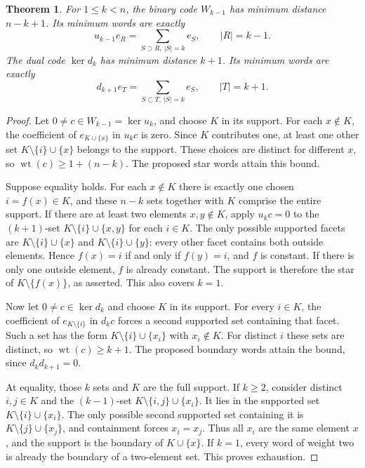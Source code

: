 \documentclass[11pt,a4paper]{article}
\newtheorem{theorem}{Theorem}[section]
\numberwithin{equation}{section}
\newcommand{\wt}{\operatorname{wt}}
\begin{document}
\begin{theorem}\label{ULCD.SimplexMin}
For $1\leq k<n$, the binary code $W_{k-1}$ has minimum distance $n-k+1$.
Its minimum words are exactly
\[
 u_{k-1}e_R=\sum_{S\supset R,\ |S|=k}e_S,
 \qquad |R|=k-1.
\]
The dual code $\ker d_k$ has minimum distance $k+1$. Its minimum words
are exactly
\[
 d_{k+1}e_T=\sum_{S\subset T,\ |S|=k}e_S,
 \qquad |T|=k+1.
\]
\end{theorem}
\begin{proof}
Let $0\ne c\in W_{k-1}=\ker u_k$, and choose $K$ in its support. For
each $x\notin K$, the coefficient of $e_{K\cup\{x\}}$ in $u_kc$ is zero.
Since $K$ contributes one, at least one other set $K\setminus\{i\}\cup\{x\}$
belongs to the support. These choices are distinct for different $x$, so
$\wt(c)\geq1+(n-k)$. The proposed star words attain this bound.

Suppose equality holds. For each $x\notin K$ there is exactly one chosen
$i=f(x)\in K$, and these $n-k$ sets together with $K$ comprise the entire
support. If there are at least two elements $x,y\notin K$, apply $u_kc=0$
to the $(k+1)$-set $K\setminus\{i\}\cup\{x,y\}$ for each $i\in K$.
The only possible supported facets are
$K\setminus\{i\}\cup\{x\}$ and $K\setminus\{i\}\cup\{y\}$: every other
facet contains both outside elements. Hence $f(x)=i$ if and only if
$f(y)=i$, and $f$ is constant. If there is only one outside element,
$f$ is already constant. The support is therefore the star of
$K\setminus\{f(x)\}$, as asserted. This also covers $k=1$.

Now let $0\ne c\in\ker d_k$ and choose $K$ in its support. For every
$i\in K$, the coefficient of $e_{K\setminus\{i\}}$ in $d_kc$ forces a
second supported set containing that facet. Such a set has the form
$K\setminus\{i\}\cup\{x_i\}$ with $x_i\notin K$. For distinct $i$ these
sets are distinct, so $\wt(c)\geq k+1$. The proposed boundary words attain
the bound, since $d_kd_{k+1}=0$.

At equality, those $k$ sets and $K$ are the full support. If $k\geq2$,
consider distinct $i,j\in K$ and the $(k-1)$-set
$K\setminus\{i,j\}\cup\{x_i\}$. It lies in the supported set
$K\setminus\{i\}\cup\{x_i\}$. The only possible second supported set
containing it is $K\setminus\{j\}\cup\{x_j\}$, and containment forces
$x_i=x_j$. Thus all $x_i$ are the same element $x$, and the support is the
boundary of $K\cup\{x\}$. If $k=1$, every word of weight two is already
the boundary of a two-element set. This proves exhaustion.
\end{proof}
\end{document}
